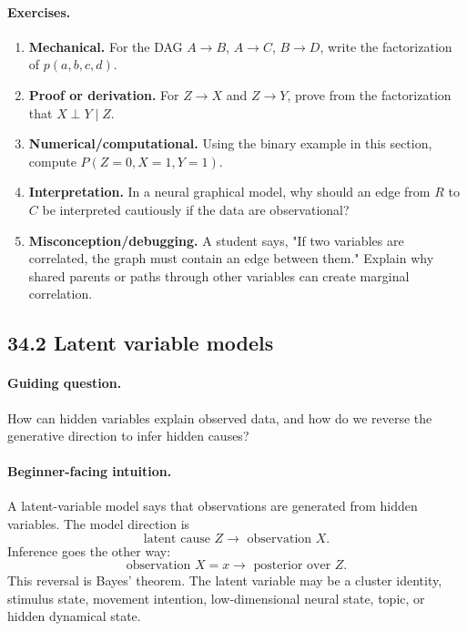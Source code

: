 \paragraph{Exercises.}
\begin{enumerate}[label=\textbf{34.1.\arabic*.}, leftmargin=*]
\item \textbf{Mechanical.} For the DAG \(A\to B\), \(A\to C\), \(B\to D\), write the factorization of \(p(a,b,c,d)\).
\item \textbf{Proof or derivation.} For \(Z\to X\) and \(Z\to Y\), prove from the factorization that \(X\perp Y\mid Z\).
\item \textbf{Numerical/computational.} Using the binary example in this section, compute \(P(Z=0,X=1,Y=1)\).
\item \textbf{Interpretation.} In a neural graphical model, why should an edge from \(R\) to \(C\) be interpreted cautiously if the data are observational?
\item \textbf{Misconception/debugging.} A student says, "If two variables are correlated, the graph must contain an edge between them." Explain why shared parents or paths through other variables can create marginal correlation.
\end{enumerate}

\subsection{34.2 Latent variable models}

\paragraph{Guiding question.}
How can hidden variables explain observed data, and how do we reverse the generative direction to infer hidden causes?

\paragraph{Beginner-facing intuition.}
A latent-variable model says that observations are generated from hidden variables. The model direction is
\[
\text{latent cause } Z \longrightarrow \text{ observation } X.
\]
Inference goes the other way:
\[
\text{observation } X=x \longrightarrow \text{ posterior over } Z.
\]
This reversal is Bayes' theorem. The latent variable may be a cluster identity, stimulus state, movement intention, low-dimensional neural state, topic, or hidden dynamical state.


